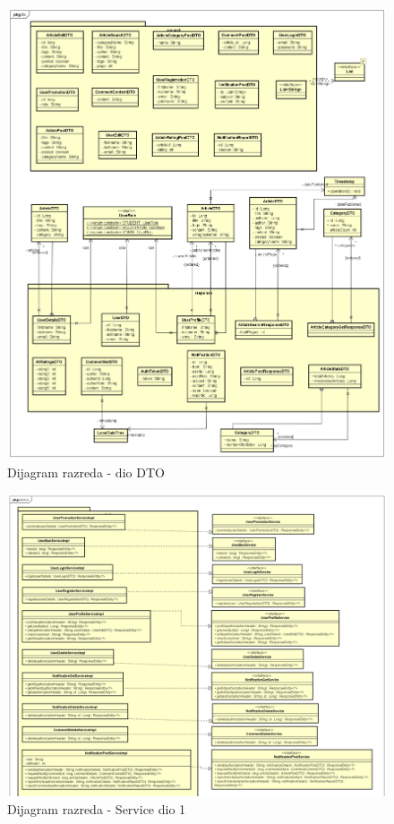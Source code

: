 \eject

\begin{figure}[H]
	\includegraphics[scale=0.4]{slike/Class Diagram DTO.png}
	\centering
	\caption{Dijagram razreda - dio DTO}
	\label{fig:class_diagram_dto}
\end{figure}

\eject

\begin{figure}[H]
	\includegraphics[scale=0.35]{slike/Class Diagram Service1.png}
	\centering
	\caption{Dijagram razreda - Service dio 1}
	\label{fig:class_diagram_service}
\end{figure}

